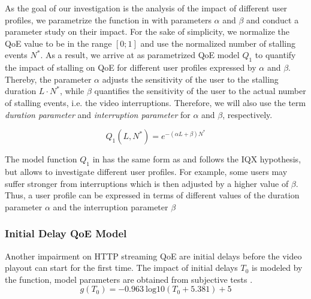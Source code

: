 As the goal of our investigation is the analysis of the impact of different user profiles, we parametrize the function in  with parameters \(\alpha\) and \(\beta\) and conduct a parameter study on their impact. 
For the sake of simplicity, we normalize the QoE value to be in the range \(\left[0;1\right]\)  and use the normalized number of stalling events $N^*$. 
As a result, we arrive at  as parametrized \gls{QoE} model \(Q_1\) to quantify the impact of stalling on QoE for different user profiles expressed by \(\alpha\) and \(\beta\). 
Thereby, the parameter \(\alpha\) adjusts the sensitivity of the user to the stalling duration \(L\cdot N^*\), while \(\beta\) quantifies the sensitivity of the user to the actual number of stalling events, i.e. the video interruptions.
Therefore, we will also use the term \emph{duration parameter} and \emph{interruption parameter} for \(\alpha\) and \(\beta\), respectively.

\begin{equation}
   Q_1(L,N^*) = e^{-\left( \alpha L + \beta\right) N^*} 
\label{eq:application:qoe_user_behaviour:typical_user_scenarios:youtube_qoe:stalling:parameterized_model}
\end{equation}

The model function \(Q_1\) in  has the same form as  and follows the IQX hypothesis, but allows to investigate different user profiles.
For example, some users may suffer stronger from interruptions which is then adjusted by a higher value of \(\beta\).
Thus, a user profile can be expressed in terms of different values of the duration parameter \(\alpha\) and the interruption parameter \(\beta\)

\subsubsection*{Initial Delay QoE Model}\label{sec:application:qoe_user_behaviour:typical_user_scenarios:initial_delay}
Another impairment on \gls{HTTP} streaming \gls{QoE} are initial delays before the video playout can start for the first time.
The impact of initial delays \(T_0\) is modeled by the function, model parameters are obtained from subjective tests \cite{Hossfeld2012c}. 
\begin{equation}
g(T_0)=-0.963 \: \mathrm{log10}(T_0 + 5.381) + 5
\label{eq:application:qoe_user_behaviour:typical_user_scenarios:initial_delay:original_model}
\end{equation}

